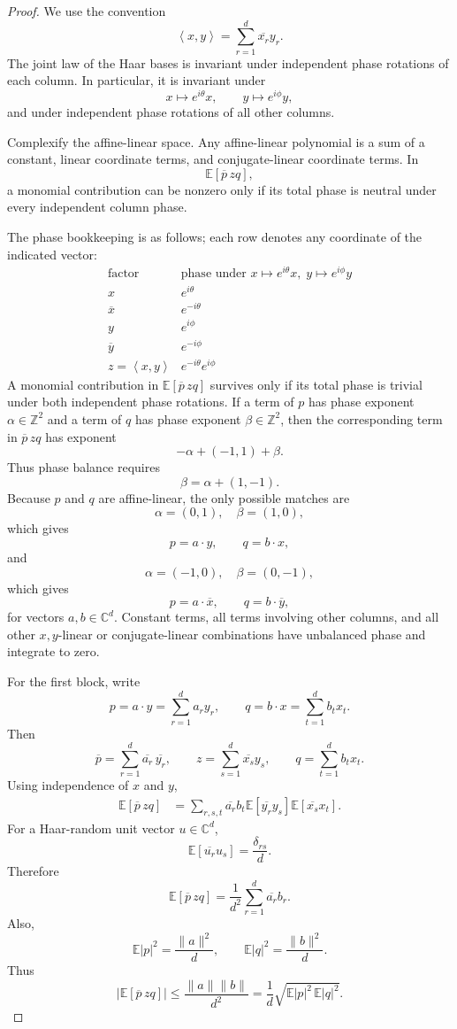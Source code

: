 \documentclass[11pt]{article}
\theoremstyle{remark}
\newcommand{\C}{\mathbb{C}}
\newcommand{\E}{\mathbb{E}}
\newcommand{\ip}[2]{\left\langle #1,#2\right\rangle}
\begin{document}
\begin{proof}
We use the convention
\[
\ip{x}{y}=\sum_{r=1}^d \overline{x_r}y_r.
\]
The joint law of the Haar bases is invariant under independent phase rotations of each column. In particular, it is invariant under
\[
x\mapsto e^{i\theta}x,
\qquad
 y\mapsto e^{i\phi}y,
\]
and under independent phase rotations of all other columns.

Complexify the affine-linear space. Any affine-linear polynomial is a sum of a constant, linear coordinate terms, and conjugate-linear coordinate terms. In
\[
\E[\overline p\,zq],
\]
a monomial contribution can be nonzero only if its total phase is neutral under every independent column phase.

The phase bookkeeping is as follows; each row denotes any coordinate of the indicated vector:
\[
\begin{array}{c|c}
\text{factor} & \text{phase under } x\mapsto e^{i\theta}x,\; y\mapsto e^{i\phi}y \\
\hline
x & e^{i\theta}\\
\overline{x} & e^{-i\theta}\\
y & e^{i\phi}\\
\overline{y} & e^{-i\phi}\\
z=\ip{x}{y} & e^{-i\theta}e^{i\phi}
\end{array}
\]
A monomial contribution in $\E[\overline p\,zq]$ survives only if its total phase is trivial under both independent phase rotations. If a term of $p$ has phase exponent $\alpha\in\mathbb Z^2$ and a term of $q$ has phase exponent $\beta\in\mathbb Z^2$, then the corresponding term in $\overline p\,zq$ has exponent
\[
-\alpha+(-1,1)+\beta.
\]
Thus phase balance requires
\[
\beta=\alpha+(1,-1).
\]
Because $p$ and $q$ are affine-linear, the only possible matches are
\[
\alpha=(0,1),\quad \beta=(1,0),
\]
which gives
\[
p=a\cdot y,
\qquad
q=b\cdot x,
\]
and
\[
\alpha=(-1,0),\quad \beta=(0,-1),
\]
which gives
\[
p=a\cdot \overline x,
\qquad
q=b\cdot \overline y,
\]
for vectors $a,b\in\C^d$. Constant terms, all terms involving other columns, and all other $x,y$-linear or conjugate-linear combinations have unbalanced phase and integrate to zero.

For the first block, write
\[
p=a\cdot y=\sum_{r=1}^d a_r y_r,
\qquad
q=b\cdot x=\sum_{t=1}^d b_t x_t.
\]
Then
\[
\overline p=\sum_{r=1}^d \overline{a_r}\,\overline{y_r},
\qquad
z=\sum_{s=1}^d \overline{x_s}y_s,
\qquad
q=\sum_{t=1}^d b_t x_t.
\]
Using independence of $x$ and $y$,
\[
\begin{aligned}
\E[\overline p\,zq]
&=
\sum_{r,s,t}
\overline{a_r}b_t
\E[\overline{y_r}y_s]
\E[\overline{x_s}x_t].
\end{aligned}
\]
For a Haar-random unit vector $u\in\C^d$,
\[
\E[\overline{u_r}u_s]=\frac{\delta_{rs}}d.
\]
Therefore
\[
\E[\overline p\,zq]
=
\frac1{d^2}\sum_{r=1}^d \overline{a_r}b_r.
\]
Also,
\[
\E|p|^2=\frac{\|a\|^2}{d},
\qquad
\E|q|^2=\frac{\|b\|^2}{d}.
\]
Thus
\[
\left|\E[\overline p\,zq]\right|
\le
\frac{\|a\|\|b\|}{d^2}
=
\frac1d\sqrt{\E|p|^2\,\E|q|^2}.
\]


\end{proof}
\end{document}
